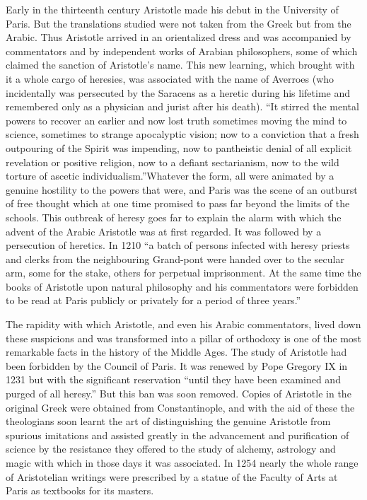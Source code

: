 \documentclass{book}
\begin{document}
Early in the thirteenth century Aristotle made his debut in the University of Paris. But the translations studied were not taken from the Greek but from the Arabic. Thus Aristotle arrived in an orientalized dress and was accompanied by commentators and by independent works of Arabian philosophers, some of which claimed the sanction of Aristotle’s name. This new learning, which brought with it a whole cargo of heresies, was associated with the name of Averroes (who incidentally was persecuted by the Saracens as a heretic during his lifetime and remembered only as a physician and jurist after his death). “It stirred the mental powers to recover an earlier and now lost truth sometimes moving the mind to science, sometimes to strange apocalyptic vision; now to a conviction that a fresh outpouring of the Spirit was impending, now to pantheistic denial of all explicit revelation or positive religion, now to a defiant sectarianism, now to the wild torture of ascetic individualism.”\footnotemark[4] Whatever the form, all were animated by a genuine hostility to the powers that were, and Paris was the scene of an outburst of free thought which at one time promised to pass far beyond the limits of the schools. This outbreak of heresy goes far to explain the alarm with which the advent of the Arabic Aristotle was at first regarded. It was followed by a persecution of heretics. In 1210 “a batch of persons infected with heresy priests and clerks from the neighbouring Grand-pont were handed over to the secular arm, some for the stake, others for perpetual imprisonment. At the same time the books of Aristotle upon natural philosophy and his commentators were forbidden to be read at Paris publicly or privately for a period of three years.”\footnotemark[5]

The rapidity with which Aristotle, and even his Arabic commentators, lived down these suspicions and was transformed into a pillar of orthodoxy is one of the most remarkable facts in the history of the Middle Ages. The study of Aristotle had been forbidden by the Council of Paris. It was renewed by Pope Gregory IX in 1231 but with the significant reservation “until they have been examined and purged of all heresy.” But this ban was soon removed. Copies of Aristotle in the original Greek were obtained from Constantinople, and with the aid of these the theologians soon learnt the art of distinguishing the genuine Aristotle from spurious imitations and assisted greatly in the advancement and purification of science by the resistance they offered to the study of alchemy, astrology and magic with which in those days it was associated. In 1254 nearly the whole range of Aristotelian writings were prescribed by a statue of the Faculty of Arts at Paris as textbooks for its masters.
\end{document}
